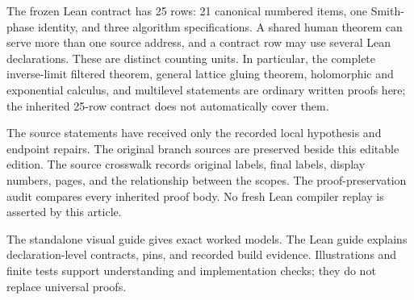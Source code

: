 \documentclass[11pt,a4paper]{article}
\theoremstyle{definition}
\theoremstyle{remark}
\theoremstyle{definition}\newtheorem{construction}[theorem]{Construction}\newtheorem{certificate}[theorem]{Numerical Certificate}
\theoremstyle{remark}\newtheorem{boundary}[theorem]{Boundary}
\begin{document}
The frozen Lean contract has 25 rows: 21 canonical numbered items, one Smith-phase identity, and three algorithm specifications.  A shared human theorem can serve more than one source address, and a contract row may use several Lean declarations.  These are distinct counting units.  In particular, the complete inverse-limit filtered theorem, general lattice gluing theorem, holomorphic and exponential calculus, and multilevel statements are ordinary written proofs here; the inherited 25-row contract does not automatically cover them.

The source statements have received only the recorded local hypothesis and endpoint repairs.  The original branch sources are preserved beside this editable edition.  The source crosswalk records original labels, final labels, display numbers, pages, and the relationship between the scopes.  The proof-preservation audit compares every inherited proof body.  No fresh Lean compiler replay is asserted by this article.

The standalone visual guide gives exact worked models.  The Lean guide explains declaration-level contracts, pins, and recorded build evidence.  Illustrations and finite tests support understanding and implementation checks; they do not replace universal proofs.

\end{document}
